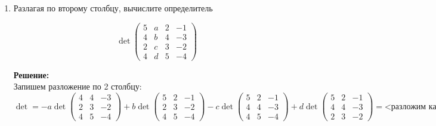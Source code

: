 \documentclass[a4paper,12pt]{article}
\begin{document}
\begin{enumerate}
$=(\lambda-1)((\lambda-1)(\lambda-4)-8)+5(2(\lambda-4)+6)=(\lambda-1)(\lambda^2+4-5\lambda-8)+5(2\lambda-8+6)=(\lambda-1)(\lambda^2-5\lambda-4)+10(\lambda-1)=(\lambda-1)(\lambda^2-5\lambda-4+10)=(\lambda-1)(\lambda^2-5\lambda+6)=(\lambda-1)(\lambda-2)(\lambda-3)$

Спектр - решения характеристического многочлена равного 0.

$$(\lambda-1)(\lambda-2)(\lambda-3)=0 \Rightarrow \begin{cases}
    \lambda = 1\\
    \lambda = 2\\
    \lambda = 3
\end{cases}$$

\textbf{Ответ: Характеристический многочлен: $(\lambda-1)(\lambda-2)(\lambda-3)$ и спектр $\begin{cases}
    \lambda = 1\\
    \lambda = 2\\
    \lambda = 3
\end{cases}$}


\item Разлагая по второму столбцу, вычислите определитель

$$
\det\begin{pmatrix}
5&a&2&-1\\
4&b&4&-3\\
2&c&3&-2\\
4&d&5&-4
\end{pmatrix}
$$


\vspace{5pt}
\textbf{Решение:}\\
Запишем разложение по 2 столбцу:
$\det = -a \det \begin{pmatrix}
4&4&-3\\
2&3&-2\\
4&5&-4
\end{pmatrix}+b \det \begin{pmatrix}
5&2&-1\\
2&3&-2\\
4&5&-4
\end{pmatrix} - c \det \begin{pmatrix}
5&2&-1\\
4&4&-3\\
4&5&-4
\end{pmatrix}+ d \det \begin{pmatrix}
5&2&-1\\
4&4&-3\\
2&3&-2
\end{pmatrix}=\text{<разложим каждый определитель по 1 столбцу>}=-a(4\cdot(-12+10)-2\cdot(-16+15)+4(-8+9))+b(5\cdot(-12+10)-2\cdot(-8+5)+4\cdot(-4+3))-c(5\cdot(-16+15)-4\cdot(-8+5)+4\cdot(-6+4))+d(5\cdot(-8+9)-4\cdot(-4+3)+2\cdot(-6+4))=2a-8b+1c+5d$


\end{enumerate}
\end{document}
